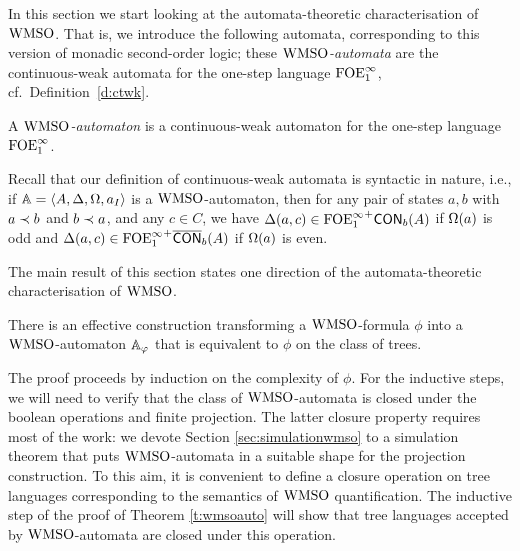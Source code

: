 

In this section we start looking at the automata-theoretic characterisation of
$\mathrm{WMSO}$.
That is, we introduce the following automata, corresponding to this version of
monadic second-order logic; these \emph{$\mathrm{WMSO}$-automata} are the continuous-weak
automata for the one-step language $\mathrm{FOE}^{\infty}_1$, cf.~Definition~\ref{d:ctwk}.

\begin{definition}
A \emph{$\mathrm{WMSO}$-automaton} is a continuous-weak automaton for the one-step
language $\mathrm{FOE}^{\infty}_1$.
\end{definition}

Recall that our definition of continuous-weak automata is syntactic in nature,
i.e., if $\mathbb{A} = \langle{A,\Delta,\Omega,a_I}\rangle$ is a $\mathrm{WMSO}$-automaton, then for any
pair of states $a,b$ with $a \prec b$ and $b \prec a$, and any $c\in C$, we have
$\Delta(a,c) \in {\ensuremath{\mathrm{FOE}^{\infty}_1}}^+\mathsf{CON}_{b}(A)$ if $\Omega(a)$ is odd and $\Delta(a,c)
\in {\ensuremath{\mathrm{FOE}^{\infty}_1}}^+\overline{\mathsf{CON}}_{b}(A)$ if $\Omega(a)$ is even.

The main result of this section states one direction of the automata-theoretic
characterisation of $\mathrm{WMSO}$.

\begin{theorem}
\label{t:wmsoauto}
There is an effective construction transforming a $\mathrm{WMSO}$-formula $\phi$
into a $\mathrm{WMSO}$-automaton $\mathbb{A}_{\varphi}$ that is equivalent
to $\phi$ on the class of trees.
\end{theorem}

The proof proceeds by induction on the complexity of
$\phi$. For the inductive steps, we will need to verify that the class of
$\mathrm{WMSO}$-automata is closed under the boolean operations and finite projection.
The latter closure property requires most of the work: we devote
Section \ref{sec:simulationwmso} to a simulation theorem that puts
$\mathrm{WMSO}$-automata in a suitable shape for the projection construction.
%
To this aim, it is convenient to define a closure operation on tree languages
corresponding to the semantics of $\mathrm{WMSO}$ quantification.
The inductive step of the proof of Theorem \ref{t:wmsoauto} will show that tree
languages accepted by $\mathrm{WMSO}$-automata are closed under this operation.

